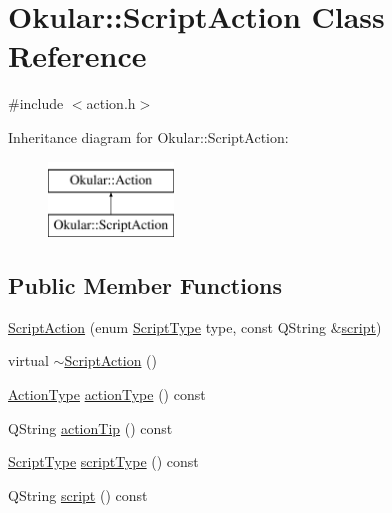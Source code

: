 \hypertarget{classOkular_1_1ScriptAction}{\section{Okular\+:\+:Script\+Action Class Reference}
\label{classOkular_1_1ScriptAction}
}


{\ttfamily \#include $<$action.\+h$>$}

Inheritance diagram for Okular\+:\+:Script\+Action\+:\begin{figure}[H]
\begin{center}
\leavevmode
\includegraphics[height=2.000000cm]{classOkular_1_1ScriptAction}
\end{center}
\end{figure}
\subsection*{Public Member Functions}
\begin{DoxyCompactItemize}
\item 
\hyperlink{classOkular_1_1ScriptAction_a4b341c19bbb115b0e2258f01c0dee6c7}{Script\+Action} (enum \hyperlink{namespaceOkular_a061f34ff835b2d2142fef28bcfd09325}{Script\+Type} type, const Q\+String \&\hyperlink{classOkular_1_1ScriptAction_ae0b45ddc3153b398e89748429aa27b06}{script})
\item 
virtual \hyperlink{classOkular_1_1ScriptAction_ac92a5b286202fdf39e60fa990b293bb2}{$\sim$\+Script\+Action} ()
\item 
\hyperlink{classOkular_1_1Action_abe474735af30ea76105595533df9ec47}{Action\+Type} \hyperlink{classOkular_1_1ScriptAction_a35cf3029915fb6c2b3c694ae2ce2520e}{action\+Type} () const 
\item 
Q\+String \hyperlink{classOkular_1_1ScriptAction_a557e181727e1992d7d9557b7f91b6221}{action\+Tip} () const 
\item 
\hyperlink{namespaceOkular_a061f34ff835b2d2142fef28bcfd09325}{Script\+Type} \hyperlink{classOkular_1_1ScriptAction_a9690816eccf3fc982a69841c890547f0}{script\+Type} () const 
\item 
Q\+String \hyperlink{classOkular_1_1ScriptAction_ae0b45ddc3153b398e89748429aa27b06}{script} () const 
\end{DoxyCompactItemize}
